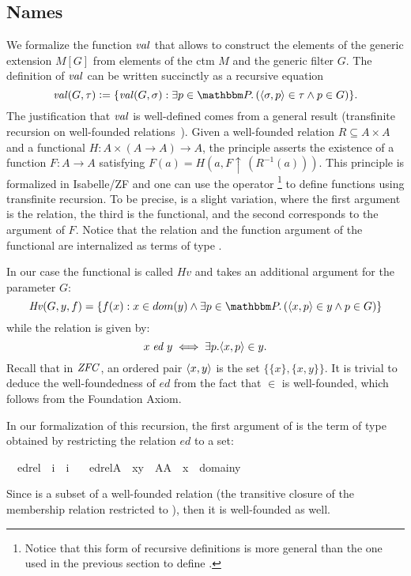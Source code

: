 \subsection{Names}
\label{sec:names}
We formalize the function $\operatorname{\mathit{val}}$ that allows to
construct the elements of the generic extension $M[G]$ from elements
of the ctm $M$ and the generic filter $G$. The definition of $\operatorname{\mathit{val}}$
can be written succinctly as a recursive equation
%
\begin{equation}\label{eq:def-val}
\val(G,\tau)\defi \{\val(G,\sigma) : \exists p\in \PP.\,
(\lb\sigma,p\rb\in\tau \y p\in G)\}.
\end{equation}
%
The justification that $\operatorname{\mathit{val}}$ is well-defined comes from a general
result (transfinite recursion on well-founded
relations~\cite[p. 48]{kunen2011set}). Given a well-founded relation
$R \subseteq A \times A$ and a functional
$H : A \times (A \to A) \to A$, the principle asserts the existence of
a function $F : A \to A$ satisfying
$F(a) = H(a,F\uparrow\,(R^{-1}(a)))$. This principle is formalized in
Isabelle/ZF and one can use the operator \footnote{Notice
  that this form of recursive definitions is more general than the one
  used in the previous section to define
  .} to define functions using
transfinite recursion. To be precise,  is a slight variation, where the first argument is the
relation, the third is the functional, and the second corresponds to
the argument of $F$. Notice that the relation and the function argument
of the functional are internalized as terms of type .

In our case the functional is called $Hv$ and takes an additional argument for the
parameter $G$:
\[
  \mathit{Hv}(G,y,f) = \{f(x) : x \in dom(y) \y \exists p\in \PP.\,
(\lb x,p\rb\in y \y p\in G)\}
\]
while the relation is given by:
\[
x \mathrel{\mathit{ed}} y \iff \exists p . \langle x,p\rangle\in y.
\]
Recall that in $\mathit{ZFC}$, an ordered pair $\langle x,y \rangle$ is the set
$\{\{x\},\{x,y\}\}$. It is trivial to deduce the well-foundedness of
$\mathit{ed}$ from the fact that $\in$ is well-founded, which follows
from the Foundation Axiom.

In our formalization of this recursion,  the first argument of
 is the term of type   obtained by restricting the
relation $\mathit{ed}$ to  a set:
% 
\begin{isabelle}
\isamarkupfalse%
\isanewline
\ \ edrel\ {\isacharcolon}{\isacharcolon}\ {\isachardoublequoteopen}i\ {\isasymRightarrow}\ i{\isachardoublequoteclose}\ \isanewline
\ \ {\isachardoublequoteopen}edrel{\isacharparenleft}A{\isacharparenright}\ {\isacharequal}{\isacharequal}\ {\isacharbraceleft}{\isacharless}x{\isacharcomma}y{\isachargreater}\ {\isasymin}\ A{\isacharasterisk}A\ {\isachardot}\ x\ {\isasymin}\ domain{\isacharparenleft}y{\isacharparenright}{\isacharbraceright}{\isachardoublequoteclose}
\end{isabelle}
%
Since  is a subset of a  well-founded relation (the
transitive closure of the membership relation restricted to ),
then it is well-founded as well.

